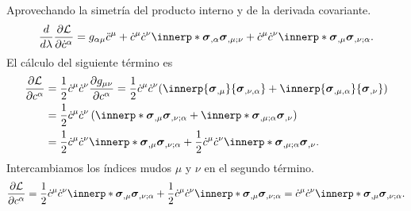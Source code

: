Aprovechando la simetría del producto interno y de la derivada covariante.
\begin{equation}
	\frac{d}{d\lambda}\partialD{\mathcal L}{\dot c^\alpha}
	= g_{\alpha\mu}\ddot c^\mu +  \dot c^\mu\dot c^\nu 
	\innerp*{\patch_{,\alpha}}{\patch_{,\mu; \nu} } + \dot c^\mu\dot c^\nu \innerp*{\patch_{,\mu}}{\patch_{,\nu; \alpha} }.
\end{equation}
El cálculo del siguiente término es
\begin{equation}
\begin{split}
	\partialD{\mathcal L}{c^\alpha} &= \frac12 \dot c^\mu \dot c^\nu \partialD{g_{\mu\nu}}{c^\alpha}
	=  \frac12 \dot c^\mu \dot c^\nu  (\innerp{\patch_{,\mu}}{\patch_{,\nu,\alpha}} + \innerp{\patch_{,\mu, \alpha}}{\patch_{,\nu}})\\
	&= \frac12 \dot c^\mu \dot c^\nu \left(
	\innerp*{\patch_{,\mu}}{\patch_{,\nu; \alpha}} + \innerp*{\patch_{,\mu; \alpha}}{\patch_{,\nu}}
	\right)\\
	&=  \frac12 \dot c^\mu \dot c^\nu \innerp*{\patch_{,\mu}}{\patch_{,\nu; \alpha}}
	+   \frac12 \dot c^\mu \dot c^\nu\innerp*{\patch_{,\mu; \alpha}}{\patch_{,\nu}}.
\end{split}
\end{equation}
Intercambiamos los índices mudos $\mu$ y $\nu$ en el segundo término.
\begin{equation}
	\partialD{\mathcal L}{c^\alpha} = \frac12 \dot c^\mu \dot c^\nu \innerp*{\patch_{,\mu}}{\patch_{,\nu; \alpha}}
	+   \frac12 \dot c^\mu \dot c^\nu \innerp*{\patch_{,\mu}}{\patch_{,\nu; \alpha}}
	= \dot c^\mu \dot c^\nu \innerp*{\patch_{,\mu}}{\patch_{,\nu; \alpha}}.
\end{equation}

